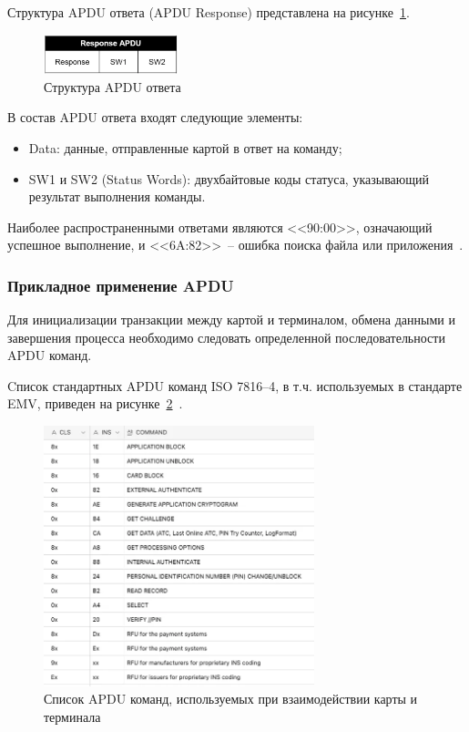 Структура APDU ответа (APDU Response) представлена на рисунке~\ref{fig:apdu_resp}.

\begin{figure}[H]
    \centering
    \includegraphics[width=0.35\textwidth]{images/research/apdu_resp}
    \caption{\centering Структура APDU ответа}
    \label{fig:apdu_resp}
\end{figure}

В состав APDU ответа входят следующие элементы:

\begin{itemize}
    \item Data: данные, отправленные картой в ответ на команду;
    \item SW1 и SW2 (Status Words): двухбайтовые коды статуса, указывающий результат выполнения команды.
\end{itemize}

Наиболее распространенными ответами являются <<90:00>>, означающий успешное выполнение, и <<6A:82>>~-- ошибка поиска файла или приложения~\cite{iso7816-4}.


\subsubsection{Прикладное применение APDU}

Для инициализации транзакции между картой и терминалом, обмена данными и завершения процесса необходимо следовать определенной последовательности APDU команд.

Cписок стандартных APDU команд ISO 7816--4, в т.ч. используемых в стандарте EMV, приведен на рисунке~\ref{fig:apdu_commands}~\cite{iso7816-4}.

\begin{figure}[h]
    \centering
    \includegraphics[width=0.7\textwidth]{images/research/apdu_commands}
    \caption{\centering Список APDU команд, используемых при взаимодействии карты и терминала}
    \label{fig:apdu_commands}
\end{figure}

